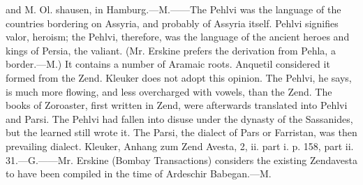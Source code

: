 {and M. Ol. shausen, in Hamburg.—M.——The Pehlvi was the language
of the countries bordering on Assyria, and probably of Assyria
itself. Pehlvi signifies valor, heroism; the Pehlvi, therefore,
was the language of the ancient heroes and kings of Persia, the
valiant. (Mr. Erskine prefers the derivation from Pehla, a
border.—M.) It contains a number of Aramaic roots. Anquetil
considered it formed from the Zend. Kleuker does not adopt this
opinion. The Pehlvi, he says, is much more flowing, and less
overcharged with vowels, than the Zend. The books of Zoroaster,
first written in Zend, were afterwards translated into Pehlvi and
Parsi. The Pehlvi had fallen into disuse under the dynasty of the
Sassanides, but the learned still wrote it. The Parsi, the
dialect of Pars or Farristan, was then prevailing dialect.
Kleuker, Anhang zum Zend Avesta, 2, ii. part i. p. 158, part ii.
31.—G.——Mr. Erskine (Bombay Transactions) considers the existing
Zendavesta to have been compiled in the time of Ardeschir
Babegan.—M.}



